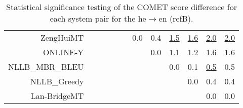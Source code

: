 \documentclass[11pt]{article}
\begin{document}
\begin{table}
\begin{center}
\begin{tabular}{rccccccccccc}
ZengHuiMT &  &    &  &  &  & \cellcolor{red!0} 0.0 & \cellcolor{red!30} 0.4 & \cellcolor{red!70} \underline{1.5} & \cellcolor{red!70} \underline{1.6} & \cellcolor{red!70} \underline{2.0} & \cellcolor{red!70} \underline{2.0}\\ 
ONLINE-Y &  &  &    &  &  &  & \cellcolor{red!0} 0.0 & \cellcolor{red!70} \underline{1.1} & \cellcolor{red!70} \underline{1.2} & \cellcolor{red!70} \underline{1.6} & \cellcolor{red!70} \underline{1.6}\\ 
NLLB\_MBR\_BLEU &    &  &  &  &  &  &  & \cellcolor{red!0} 0.0 & \cellcolor{red!0} 0.1 & \cellcolor{red!70} \underline{0.5} & \cellcolor{red!50} 0.5\\ 
NLLB\_Greedy &  &    &  &  &  &  &  &  & \cellcolor{red!0} 0.0 & \cellcolor{red!60} 0.4 & \cellcolor{red!0} 0.4\\ 
Lan-BridgeMT &  &    &  &  &  &  &  &  &  & \cellcolor{red!0} 0.0 & \cellcolor{red!0} 0.0\\ 
\bottomrule 
\end{tabular} 
\caption{Statistical significance testing of the COMET score difference for each system pair for the he$\rightarrow$en (refB).} 
 \end{center} \end{table} 
\end{document}
